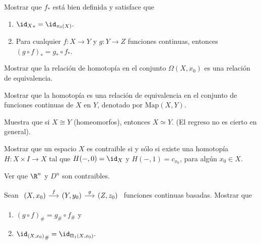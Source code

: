 \begin{ejercicio}
    Mostrar que $f_*$ está bien definida y satisface que
    \begin{enumerate}[label=(\arabic*)]
        \item  ${\id_X}_*=\id_{\pi_0(X)}.$
        \item  Para cualquier $f:X\to Y$ y $g:Y\to Z$ funciones continuas, entonces $(g\circ f)_*=g_*\circ f_*$.
    \end{enumerate}
\end{ejercicio}

\begin{ejercicio}
    Mostrar que la relación de homotopía en el conjunto $\Omega(X,x_0)$ es una relación de equivalencia.
\end{ejercicio}

\begin{ejercicio}
        Mostrar que la homotopía es una relación de equivalencia en el conjunto de funciones continuas de $X$ en $Y$, denotado por $\text{Map}(X,Y)$.
    \end{ejercicio}

\begin{ejercicio}
        Muestra que si $X\cong Y$ (homeomorfos), entonces $X\simeq Y$. (El regreso no es cierto en general).
    \end{ejercicio}

\begin{ejercicio}
        Mostrar que un espacio $X$ es contraible si y sólo si existe una homotopía $H:X\times I\to X$ tal que $H(-,0)=\id_X$ y $H(-,1)=c_{x_0}$, para algún $x_0\in X$.
    \end{ejercicio}

\begin{ejercicio}
        Ver que $\R^n$ y $D^n$ son contraibles.
    \end{ejercicio}

\begin{ejercicio}
    \label{eje:Pi_1_es_invariante}
        Sean 
        $
            \begin{tikzcd}[column sep=0.5cm]
            (X,x_0) \arrow[r, "f"] & (Y,y_0)\arrow[r, "g"] & (Z,z_0)
        \end{tikzcd}
        $
        funciones continuas basadas. Mostrar que
        \begin{enumerate}
            \item [(1)] ${(g\circ f)}_{\#}=g_{\#}\circ f_{\#}$ y
            \item[(2)] ${\id_{(X,x_0)}}_{\#}=\id_{\Pi_1(X,x_0)}.$ 
        \end{enumerate}
    \end{ejercicio}

